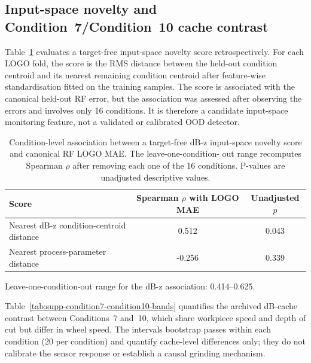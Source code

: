 \begin{table}[htbp]
\centering
\caption{LOGO fold target-support analysis. Condition~7 is the only
high-roughness extrapolation fold; Condition~10 is a minor lower-bound
extrapolation.}
\label{tab:supp-logo-extrapolation}
\resizebox{\linewidth}{!}{%

}
\end{table}

\subsection*{Input-space novelty and Condition~7/Condition~10 cache contrast}

Table~\ref{tab:supp-input-ood} evaluates a target-free input-space novelty
score retrospectively. For each LOGO fold, the score is the RMS distance
between the held-out condition centroid and its nearest remaining condition
centroid after feature-wise standardisation fitted on the training samples.
The score is associated with the canonical held-out RF error, but the
association was assessed after observing the errors and involves only 16
conditions. It is therefore a candidate input-space monitoring feature, not
a validated or calibrated OOD detector.

\begin{table}[htbp]
\centering
\caption{Condition-level association between a target-free dB-z
input-space novelty score and canonical RF LOGO MAE. The leave-one-condition-
out range recomputes Spearman \(\rho\) after removing each one of the 16
conditions. P-values are unadjusted descriptive values.}
\label{tab:supp-input-ood}
\begin{tabular}{@{}lcc@{}}
\toprule
Score & Spearman \(\rho\) with LOGO MAE & Unadjusted \(p\) \\
\midrule
Nearest dB-z condition-centroid distance & 0.512 & 0.043 \\
Nearest process-parameter distance & -0.256 & 0.339 \\
\bottomrule
\end{tabular}

\vspace{0.4em}
\small Leave-one-condition-out range for the dB-z association: 0.414--0.625.
\end{table}

Table~\ref{tab:supp-condition7-condition10-bands} quantifies the archived
dB-cache contrast between Conditions~7 and~10, which share workpiece speed
and depth of cut but differ in wheel speed. The intervals bootstrap passes
within each condition (20 per condition) and quantify cache-level
differences only; they do not calibrate the sensor response or establish a
causal grinding mechanism.

